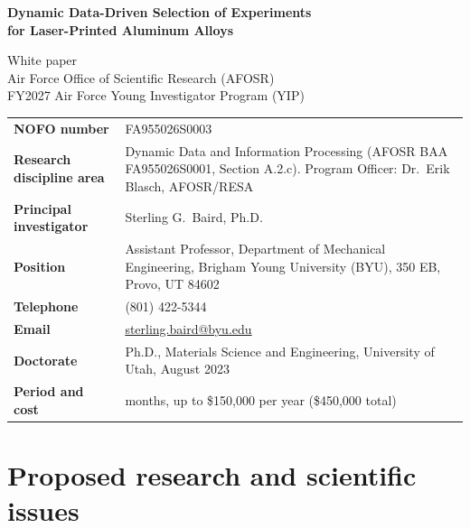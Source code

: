 \documentclass[12pt,letterpaper]{article}
\begin{document}
\begin{titlepage}
\begin{center}
{\Large\bfseries Dynamic Data-Driven Selection of Experiments\\
for Laser-Printed Aluminum Alloys\par}
\vspace{18pt}
White paper\\
Air Force Office of Scientific Research (AFOSR)\\
FY2027 Air Force Young Investigator Program (YIP)
\end{center}
\vspace{18pt}
\begin{tabular}{@{}>{\bfseries}p{1.9in}>{\raggedright\arraybackslash}p{4.4in}@{}}
NOFO number & FA955026S0003 \\
Research discipline area & Dynamic Data and Information Processing
  (AFOSR BAA FA955026S0001, Section A.2.c). Program Officer: Dr.~Erik
  Blasch, AFOSR/RESA \\
Principal investigator & Sterling G.\ Baird, Ph.D. \\
Position & Assistant Professor, Department of Mechanical Engineering,
  Brigham Young University (BYU), 350 EB, Provo, UT 84602 \\
Telephone & (801) 422-5344 \\
Email & \href{mailto:sterling.baird@byu.edu}{sterling.baird@byu.edu} \\
Doctorate & Ph.D., Materials Science and Engineering, University of Utah,
  August 2023 \\
Period and cost & 36 months, up to \$150,000 per year (\$450,000 total) \\
\end{tabular}
\end{titlepage}

\setcounter{page}{1}

\section{Proposed research and scientific issues}
\end{document}
